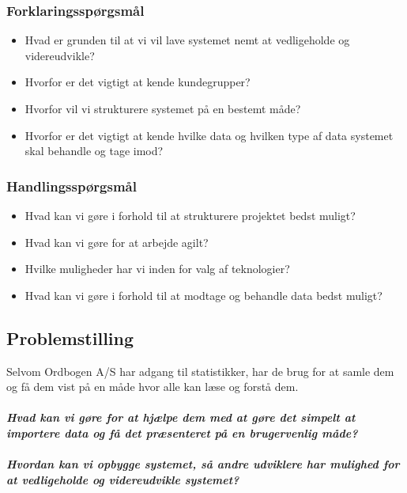 \subsubsection{Forklaringsspørgsmål}
\begin{itemize}
    \item{Hvad er grunden til at vi vil lave systemet nemt at vedligeholde og videreudvikle?}
    \item{Hvorfor er det vigtigt at kende kundegrupper?}
    \item{Hvorfor vil vi strukturere systemet på en bestemt måde?}
    \item{Hvorfor er det vigtigt at kende hvilke data og hvilken type af data systemet skal behandle og tage imod?}
\end{itemize}
\subsubsection{Handlingsspørgsmål}
\begin{itemize}
    \item{Hvad kan vi gøre i forhold til at strukturere projektet bedst muligt?}
    \item{Hvad kan vi gøre for at arbejde agilt?}
    \item{Hvilke muligheder har vi inden for valg af teknologier?}
    \item{Hvad kan vi gøre i forhold til at modtage og behandle data bedst muligt?}
\end{itemize}
\subsection{Problemstilling}
Selvom Ordbogen A/S har adgang til statistikker, har de brug for at samle dem og få dem vist på en måde hvor alle kan læse og forstå dem.
\\\\
\textbf{\textit{Hvad kan vi gøre for at hjælpe dem med at gøre det simpelt at importere data og få det præsenteret på en brugervenlig måde?}}
\\\\
\textbf{\textit{Hvordan kan vi opbygge systemet, så andre udviklere har mulighed for at vedligeholde og videreudvikle systemet?}}

